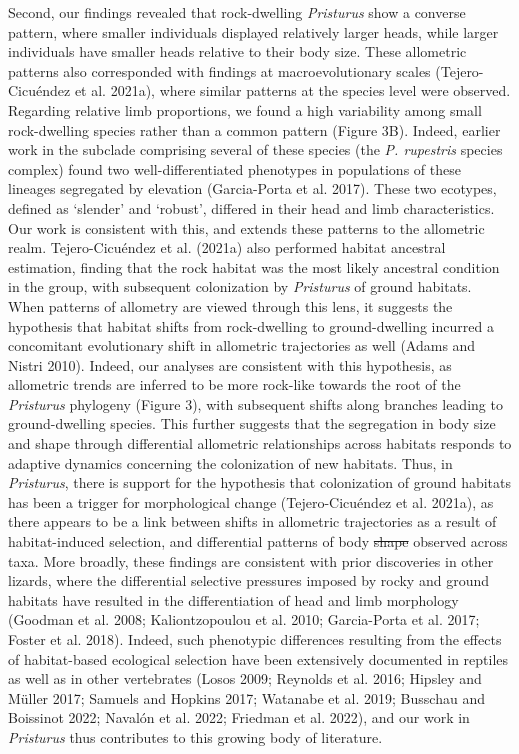 \documentclass[
  11pt,
]{article}
\providecommand{\DIFaddtex}[1]{{\protect\color{blue}\uwave{#1}}} %
\providecommand{\DIFdeltex}[1]{{\protect\color{red}\sout{#1}}}                      %
\providecommand{\DIFaddbegin}{} %
\providecommand{\DIFaddend}{} %
\providecommand{\DIFdelbegin}{} %
\providecommand{\DIFdelend}{} %
\providecommand{\DIFadd}[1]{\texorpdfstring{\DIFaddtex{#1}}{#1}} %
\providecommand{\DIFdel}[1]{\texorpdfstring{\DIFdeltex{#1}}{}} %
\newcommand{\DIFscaledelfig}{0.5}
\newlength{\DIFdelgraphicswidth} %
\newlength{\DIFdelgraphicsheight} %
\newcommand{\DIFaddincludegraphics}[2][]{{\color{blue}\fbox{\DIFOincludegraphics[#1]{#2}}}} %
\newcommand{\DIFdelincludegraphics}[2][]{%
\sbox{\DIFdelgraphicsbox}{\DIFOincludegraphics[#1]{#2}}%
\settoboxwidth{\DIFdelgraphicswidth}{\DIFdelgraphicsbox} %
\settoboxtotalheight{\DIFdelgraphicsheight}{\DIFdelgraphicsbox} %
\scalebox{\DIFscaledelfig}{%
\parbox[b]{\DIFdelgraphicswidth}{\usebox{\DIFdelgraphicsbox}\\[-\baselineskip] \rule{\DIFdelgraphicswidth}{0em}}\llap{\resizebox{\DIFdelgraphicswidth}{\DIFdelgraphicsheight}{%
\setlength{\unitlength}{\DIFdelgraphicswidth}%
\begin{picture}(1,1)%
\thicklines\linethickness{2pt} %
{\color[rgb]{1,0,0}\put(0,0){\framebox(1,1){}}}%
{\color[rgb]{1,0,0}\put(0,0){\line( 1,1){1}}}%
{\color[rgb]{1,0,0}\put(0,1){\line(1,-1){1}}}%
\end{picture}%
}\hspace*{3pt}}} %
} %
\DeclareRobustCommand{\DIFaddbegin}{\DIFOaddbegin \let\includegraphics\DIFaddincludegraphics} %
\DeclareRobustCommand{\DIFaddend}{\DIFOaddend \let\includegraphics\DIFOincludegraphics} %
\DeclareRobustCommand{\DIFdelbegin}{\DIFOdelbegin \let\includegraphics\DIFdelincludegraphics} %
\DeclareRobustCommand{\DIFdelend}{\DIFOaddend \let\includegraphics\DIFOincludegraphics} %
\begin{document}
Second, our findings revealed that \DIFaddbegin \DIFadd{within species, }\DIFaddend rock-dwelling
\emph{Pristurus} show a converse pattern, where smaller individuals
displayed relatively larger heads, while larger individuals have smaller
heads relative to their body size. These allometric patterns also
corresponded with findings at macroevolutionary scales (Tejero-Cicuéndez
et al. 2021a), where similar patterns at the species level were
observed. Regarding relative limb proportions, we found a high
variability among small rock-dwelling species rather than a common
pattern (Figure 3B). Indeed, earlier work in the subclade comprising
several of these species (the \emph{P. rupestris} species complex) found
two well-differentiated phenotypes in populations of these lineages
segregated by elevation (Garcia-Porta et al. 2017). These two ecotypes,
defined as `slender' and `robust', differed in their head and limb
characteristics. Our work is consistent with this, and extends these
patterns to the allometric realm. Tejero-Cicuéndez et al. (2021a) also
performed habitat ancestral estimation, finding that the rock habitat
was the most likely ancestral condition in the group, with subsequent
colonization by \emph{Pristurus} of ground habitats. When patterns of
allometry are viewed through this lens, it suggests the hypothesis that
habitat shifts from rock-dwelling to ground-dwelling incurred a
concomitant evolutionary shift in allometric trajectories as well (Adams
and Nistri 2010). Indeed, our analyses are consistent with this
hypothesis, as allometric trends are inferred to be more rock-like
towards the root of the \emph{Pristurus} phylogeny (Figure 3), with
subsequent shifts along branches leading to ground-dwelling species.
This further suggests that the segregation in body size and shape
through differential allometric relationships across habitats responds
to adaptive dynamics concerning the colonization of new habitats. Thus,
in \emph{Pristurus}, there is support for the hypothesis that
colonization of ground habitats has been a trigger for morphological
change (Tejero-Cicuéndez et al. 2021a), as there appears to be a link
between shifts in allometric trajectories as a result of habitat-induced
selection, and differential patterns of body \DIFdelbegin \DIFdel{shape
}\DIFdelend \DIFaddbegin \DIFadd{form }\DIFaddend observed across taxa.
More broadly, these findings are consistent with prior discoveries in
other lizards, where the differential selective pressures imposed by
rocky and ground habitats have resulted in the differentiation of head
and limb morphology (Goodman et al. 2008; Kaliontzopoulou et al. 2010;
Garcia-Porta et al. 2017; Foster et al. 2018). Indeed, such phenotypic
differences resulting from the effects of habitat-based ecological
selection have been extensively documented in reptiles as well as in
other vertebrates (Losos 2009; Reynolds et al. 2016; Hipsley and Müller
2017; Samuels and Hopkins 2017; Watanabe et al. 2019; Busschau and
Boissinot 2022; Navalón et al. 2022; Friedman et al. 2022), and our work
in \emph{Pristurus} thus contributes to this growing body of literature.
\hfill\break
\end{document}

